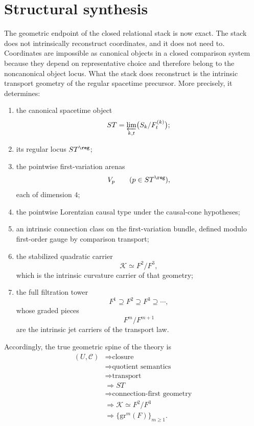\section{Structural synthesis}
\label{sec:connection-conclusion}
The geometric endpoint of the closed relational stack is now exact.
The stack does not intrinsically reconstruct coordinates, and it does
not need to.  Coordinates are impossible as canonical objects in a
closed comparison system because they depend on representative choice
and therefore belong to the noncanonical object locus.
What the stack does reconstruct is the intrinsic transport geometry of
the regular spacetime precursor.
More precisely, it determines:
\begin{enumerate}[label=\textup{(\roman*)}]
	\item
	      the canonical spacetime object
	      \[
		      ST=\varprojlim_{k,t}\bigl(S_k/F_t^{(k)}\bigr);
	      \]
	\item
	      its regular locus \(ST^{\reg}\);
	\item
	      the pointwise first-variation arenas
	      \[
		      V_p
		      \qquad (p\in ST^{\reg}),
	      \]
	      each of dimension \(4\);
	\item
	      the pointwise Lorentzian causal type under the causal-cone hypotheses;
	\item
	      an intrinsic connection class on the first-variation bundle, defined
	      modulo first-order gauge by comparison transport;
	\item
	      the stabilized quadratic carrier
	      \[
		      \mathcal K\simeq F^2/F^3,
	      \]
	      which is the intrinsic curvature carrier of that geometry;
	\item
	      the full filtration tower
	      \[
		      F^1\supseteq F^2\supseteq F^3\supseteq\cdots,
	      \]
	      whose graded pieces
	      \[
		      F^m/F^{m+1}
	      \]
	      are the intrinsic jet carriers of the transport law.
\end{enumerate}
Accordingly, the true geometric spine of the theory is
\[
	\begin{aligned}
		(U,\mathcal C) & \Longrightarrow \text{closure}                   \\
		               & \Longrightarrow \text{quotient semantics}        \\
		               & \Longrightarrow \text{transport}                 \\
		               & \Longrightarrow ST                               \\
		               & \Longrightarrow \text{connection-first geometry} \\
		               & \Longrightarrow \mathcal K \simeq F^2/F^3        \\
		               & \Longrightarrow \{\text{gr}^m(F)\}_{m \ge 1}.
	\end{aligned}
\]
